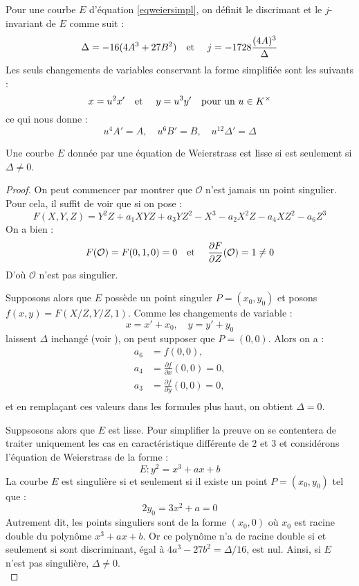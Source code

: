 \documentclass[a4paper]{article} %
\numberwithin{section}{part}
\numberwithin{equation}{section}
\newcommand\EO{\mathcal{O}}
\newcommand\etmath{\textup{\quad et \quad}}
\begin{document}
Pour une courbe $E$ d'équation \ref{eqweiersimpl}, on définit le discrimant et
le $j$-invariant de $E$ comme suit :
\[\Delta = -16(4A^3 + 27B^2) \etmath j = -1728\frac{(4A)^3}{\Delta}\]
Les seuls changements de variables conservant la forme simplifiée sont les
suivants :
\[x = u^2x' \etmath y = u^3y' \textup{\quad pour un } u\in K^{\times}\]
ce qui nous donne :
\[u^4A' = A, \quad u^6B' = B, \quad u^{12}\Delta' = \Delta\]

\begin{prop}
\label{deflisse}
Une courbe $E$ donnée par une équation de Weierstrass est lisse si est seulement
si $\Delta \neq 0$.
\end{prop}
\begin{proof}
On peut commencer par montrer que $\EO$ n'est jamais un point singulier. Pour
cela, il suffit de voir que si on pose :
\[F(X,Y,Z) = Y^2Z + a_1XYZ + a_3YZ^2 - X^3 - a_2X^2Z - a_4XZ^2 - a_6Z^3\]
On a bien :
\[F(\EO) = F(0, 1, 0) = 0 \etmath \frac{\partial F}{\partial Z}(\EO) = 1 \neq
0\]
D'où $\EO$ n'est pas singulier.\par
Supposons alors que $E$ possède un point singuler $P = (x_0, y_0)$ et posons
$f(x,y) = F(X/Z,Y/Z,1)$. Comme les changements de variable :
\[x = x' + x_0, \quad y = y' + y_0\]
laissent $\Delta$ inchangé (voir \cite[Chap. III,p.~44-45]{Sil}), 
on peut supposer que $P = (0,0)$. Alors on a :
\begin{align*}
a_6 &= f(0,0),\\
a_4 &= \frac{\partial f}{\partial x}(0,0) = 0,\\
a_3 &= \frac{\partial f}{\partial y}(0,0) = 0,\\
\end{align*}
et en remplaçant ces valeurs dans les formules plus haut,
on obtient $\Delta = 0$.\par
Suppsosons alors que $E$ est lisse. Pour simplifier la preuve on se contentera
de traiter uniquement les cas en caractéristique différente de $2$ et $3$ et
considérons l'équation de Weierstrass de la forme :
\[E : y^2 = x^3 + ax + b\]
La courbe $E$ est singulière si et seulement si il existe un point $P = 
(x_0,y_0)$ tel que :
\[2y_0 = 3x^2 + a = 0\]
Autrement dit, les points singuliers sont de la forme $(x_0, 0)$ où $x_0$ est
racine double du polynôme $x^3 + ax + b$. Or ce polynôme n'a de racine double si
et seulement si sont discriminant, égal à $4a^3 - 27b^2 = \Delta/16$, est nul.
Ainsi, si $E$ n'est pas singulière, $\Delta\neq0$.\\
\end{proof}
\end{document}

